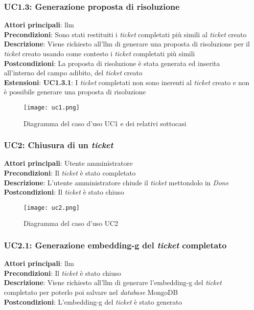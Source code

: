 \subsubsection{UC1.3: Generazione proposta di risoluzione}
\textbf{Attori principali}: \gls{llm} \\
\textbf{Precondizioni}: Sono stati restituiti i \textit{ticket} completati più simili al \textit{ticket} creato \\
\textbf{Descrizione}: Viene richiesto all'\gls{llm} di generare una proposta di risoluzione per il \textit{ticket} creato usando come contesto i \textit{ticket} completati più simili \\
\textbf{Postcondizioni}: La proposta di risoluzione è stata generata ed inserita all'interno del campo adibito, del \textit{ticket} creato \\
\textbf{Estensioni}: \textbf{UC1.3.1}: I \textit{ticket} completati non sono inerenti al \textit{ticket} creato e non è possibile generare una proposta di risoluzione \\
\begin{figure}[H]
    \centering
    \texttt{[image: uc1.png]}
    \caption{Diagramma del caso d'uso UC1 e dei relativi sottocasi}
    \label{fig:UC1}
\end{figure}

\subsubsection{UC2: Chiusura di un \textit{ticket}}
\textbf{Attori principali}: Utente amministratore \\
\textbf{Precondizioni}: Il \textit{ticket} è stato completato \\
\textbf{Descrizione}: L'utente amministratore chiude il \textit{ticket} mettondolo in \textit{Done}\\ 
\textbf{Postcondizioni}: Il \textit{ticket} è stato chiuso \\

\begin{figure}[H]
    \centering
    \texttt{[image: uc2.png]}
    \caption{Diagramma del caso d'uso UC2}
    \label{fig:UC2}
\end{figure}


\subsubsection{UC2.1: Generazione \gls{embedding-g} del \textit{ticket} completato}
\textbf{Attori principali}: \gls{llm} \\
\textbf{Precondizioni}: Il \textit{ticket} è stato chiuso \\
\textbf{Descrizione}: Viene richiesto all'\gls{llm} di generare l'\gls{embedding-g} del \textit{ticket} completato per poterlo poi salvare nel \textit{database} MongoDB \\
\textbf{Postcondizioni}: L'\gls{embedding-g} del \textit{ticket} è stato generato \\

